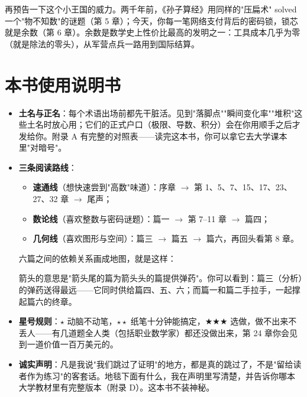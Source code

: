 再预告一下这个小王国的威力。两千年前，《孙子算经》用同样的"压扁术" solved 一个"物不知数"的谜题（第 5 章）；今天，你每一笔网络支付背后的密码锁，锁芯就是余数（第 6 章）。余数是数学史上性价比最高的发明之一：工具成本几乎为零（就是除法的零头），从军营点兵一路用到国际结算。

\section{本书使用说明书}

\begin{itemize}
  \item \textbf{土名与正名}：每个术语出场前都先干脏活。见到"落脚点""瞬间变化率""堆积"这些土名时放心用；它们的正式户口（极限、导数、积分）会在你用顺手之后才发给你。附录 A 有完整的对照表——读完这本书，你可以拿它去大学课本里"对暗号"。
  \item \textbf{三条阅读路线}：
  \begin{itemize}
    \item \textbf{速通线}（想快速尝到"高数"味道）：序章 $\to$ 第 1、5、7、15、17、23、27、32 章 $\to$ 尾声；
    \item \textbf{数论线}（喜欢整数与密码谜题）：篇一 $\to$ 第 7--11 章 $\to$ 篇四；
    \item \textbf{几何线}（喜欢图形与空间）：篇三 $\to$ 篇五 $\to$ 篇六，再回头看第 8 章。
  \end{itemize}
  六篇之间的依赖关系画成地图，就是这样：

\begin{center}
\end{center}

  箭头的意思是"箭头尾的篇为箭头头的篇提供弹药"。你可以看到：篇三（分析）的弹药送得最远——它同时供给篇四、五、六；而篇一和篇二手拉手，一起撑起篇六的终章。
  \item \textbf{星号规则}：$\star$ 动脑不动笔，$\star\star$ 纸笔十分钟能搞定，$\bigstar\bigstar\bigstar$ 选做，做不出来不丢人——有几道题全人类（包括职业数学家）都还没做出来，第 24 章你会见到一道价值一百万美元的。
  \item \textbf{诚实声明}：凡是我说"我们跳过了证明"的地方，都是真的跳过了，不是"留给读者作为练习"的客套话。地毯下面有什么，我在声明里写清楚，并告诉你哪本大学教材里有完整版本（附录 D）。这本书不装神秘。
\end{itemize}

